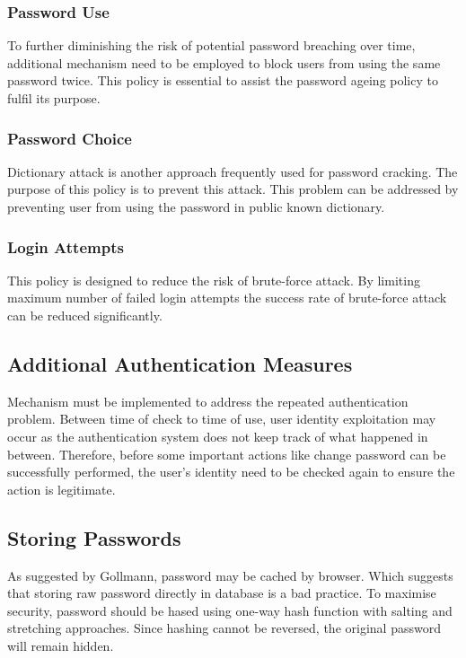 \documentclass{article}
\begin{document}
\subsubsection{Password Use}
To further diminishing the risk of potential password breaching over time, additional mechanism 
need to be employed to block users from using the same password twice. This policy is essential 
to assist the password ageing policy to fulfil its purpose.

\subsubsection{Password Choice}
Dictionary attack is another approach frequently used for password cracking. The purpose of 
this policy is to prevent this attack. This problem can be addressed by preventing user from 
using the password in public known dictionary.

\subsubsection{Login Attempts}
This policy is designed to reduce the risk of brute-force attack. By limiting maximum number of 
failed login attempts the success rate of brute-force attack can be reduced significantly.

\subsection{Additional Authentication Measures}
Mechanism must be implemented to address the repeated authentication problem. 
Between time of check to time of use, user identity exploitation may occur as the 
authentication system does not keep track of what happened in between. 
Therefore, before some important actions like change password can be successfully performed, 
the user's identity need to be checked again to ensure the action is legitimate.

\subsection{Storing Passwords}
As suggested by Gollmann, password may be cached by browser\cite{GollmannDieter2011Cs/D}. Which 
suggests that storing raw password directly in database is a bad practice. To maximise security, 
password should be hased using one-way hash function with salting and stretching approaches\cite{FergusonNiels2010Ce:d}.
Since hashing cannot be reversed, the original password will remain hidden.
\end{document}
